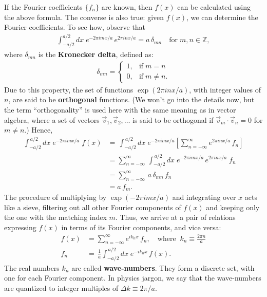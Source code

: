\documentclass[10pt,a4paper]{article}
\begin{document}
If the Fourier coefficients $\{f_n\}$ are known, then $f(x)$ can be
calculated using the above formula.  The converse is also true: given
$f(x)$, we can determine the Fourier coefficients. To see how, observe
that
\begin{align}
  \int_{-a/2}^{a/2} dx \; e^{-2\pi i m x/a}\, e^{2\pi i n x/a} = a\, \delta_{mn}\quad \mathrm{for}\;m, n \in \mathbb{Z},
\end{align}
where $\delta_{mn}$ is the \textbf{Kronecker delta}, defined as:
\begin{align}
  \delta_{mn} = \left\{\begin{array}{ll}1, & \textrm{if}\; m = n\\ 0, & \mathrm{if}\;m\ne n.\end{array}\right.
\end{align}
Due to this property, the set of functions $\exp(2\pi i n x / a)$,
with integer values of $n$, are said to be \textbf{orthogonal}
functions.  (We won't go into the details now, but the term
``orthogonality'' is used here with the same meaning as in vector
algebra, where a set of vectors $\vec{v}_1, \vec{v}_2, \dots$ is said
to be orthogonal if $\vec{v}_m \cdot \vec{v}_n = 0$ for $m\ne n$.)
Hence,
\begin{align}
  \int_{-a/2}^{\,a/2} dx\; e^{-2\pi i m x/a} \;f(x)
  &= \, \int_{-a/2}^{\,a/2} dx\; e^{-2\pi i m x/a} \left[\sum_{n=-\infty}^\infty e^{2\pi i n x/a}\, f_n\right] \\
  &= \sum_{n=-\infty}^\infty \, \int_{-a/2}^{\,a/2} dx\; e^{-2\pi i m x/a}  \, e^{2\pi i n x/a} \;f_n \\
  &= \sum_{n=-\infty}^\infty \, a\, \delta_{mn} \, f_n \\
  &= a \,f_m.
\end{align}
The procedure of multiplying by $\exp(-2\pi i m x/a)$ and integrating
over $x$ acts like a sieve, filtering out all other Fourier components
of $f(x)$ and keeping only the one with the matching index $m$.  Thus,
we arrive at a pair of relations expressing $f(x)$ in terms of its
Fourier components, and vice versa:
\begin{align}
  f(x) &= \sum_{n=-\infty}^\infty e^{i k_n x}\, f_n, \quad \mathrm{where}\;\; k_n \equiv \frac{2\pi n}{a} \\
  f_n &= \displaystyle\,\frac{1}{a} \int_{-a/2}^{\,a/2} dx\; e^{-i k_n x}\, f(x).
  \label{eq:fn}
\end{align}
The real numbers $k_n$ are called \textbf{wave-numbers}.  They form a
discrete set, with one for each Fourier component.  In physics jargon,
we say that the wave-numbers are quantized to integer multiples of
$\Delta k \equiv 2\pi/a.$
\end{document}
